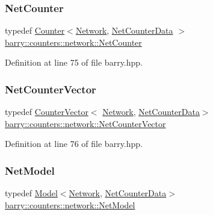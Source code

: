 \subsubsection{\texorpdfstring{Net\+Counter}{NetCounter}}
{\footnotesize\ttfamily typedef \hyperlink{classbarry_1_1_counter}{Counter}$<$\hyperlink{namespacebarry_1_1counters_1_1network_a4cb88d4572ded3b447ea269c9cd0b2c0}{Network}, \hyperlink{classbarry_1_1counters_1_1network_1_1_net_counter_data}{Net\+Counter\+Data} $>$ \hyperlink{namespacebarry_1_1counters_1_1network_a067bd9de04608fc2e1586324d3864a45}{barry\+::counters\+::network\+::\+Net\+Counter}}



Definition at line 75 of file barry.\+hpp.

\mbox{\label{namespacebarry_1_1counters_1_1network_a3b3c590303d47840d1967372ae495d95}} 
\subsubsection{\texorpdfstring{Net\+Counter\+Vector}{NetCounterVector}}
{\footnotesize\ttfamily typedef \hyperlink{classbarry_1_1_counter_vector}{Counter\+Vector}$<$ \hyperlink{namespacebarry_1_1counters_1_1network_a4cb88d4572ded3b447ea269c9cd0b2c0}{Network}, \hyperlink{classbarry_1_1counters_1_1network_1_1_net_counter_data}{Net\+Counter\+Data}$>$ \hyperlink{namespacebarry_1_1counters_1_1network_a3b3c590303d47840d1967372ae495d95}{barry\+::counters\+::network\+::\+Net\+Counter\+Vector}}



Definition at line 76 of file barry.\+hpp.

\mbox{\label{namespacebarry_1_1counters_1_1network_a3ab1ee0750d4a5b0f92253874e055358}} 
\subsubsection{\texorpdfstring{Net\+Model}{NetModel}}
{\footnotesize\ttfamily typedef \hyperlink{classbarry_1_1_model}{Model}$<$\hyperlink{namespacebarry_1_1counters_1_1network_a4cb88d4572ded3b447ea269c9cd0b2c0}{Network}, \hyperlink{classbarry_1_1counters_1_1network_1_1_net_counter_data}{Net\+Counter\+Data}$>$ \hyperlink{namespacebarry_1_1counters_1_1network_a3ab1ee0750d4a5b0f92253874e055358}{barry\+::counters\+::network\+::\+Net\+Model}}



